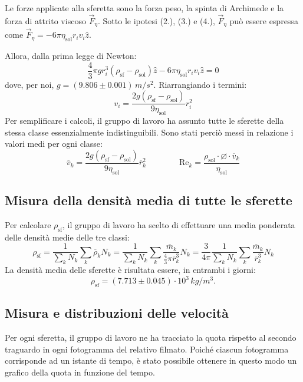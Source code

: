 \documentclass{article}
\newcommand*{\diam}{\varnothing}
\begin{document}
\vspace{2mm}

Le forze applicate alla sferetta sono la forza peso, la spinta di Archimede
e la forza di attrito viscoso $\vec{F}_\eta$.
Sotto le ipotesi (2.), (3.) e (4.), $\vec{F}_\eta$ può essere espressa come
$\vec{F}_\eta = -6\pi\eta_\text{sol} r_i v_i\hat{z}$.

Allora, dalla prima legge di Newton:
\[
  \frac{4}{3}\pi g r_i^3 (\rho_\text{sf} - \rho_\text{sol}) \hat{z}
  -6\pi\eta_\text{sol} r_i v_i\hat{z} = 0
\]
dove, per noi, $g = (9.806\pm0.001)\,\unit{m\per s^2}$.
Riarrangiando i termini:
\[
  v_i = \frac{2g(\rho_\text{sf} - \rho_\text{sol})}{9\eta_\text{sol}} r_i^2
\]
Per semplificare i calcoli, il gruppo di lavoro ha assunto tutte le sferette
della stessa classe essenzialmente indistinguibili. Sono stati perciò messi
in relazione i valori medi per ogni classe: \[
  \overline{v}_k = \frac{2g(\rho_\text{sf} - \rho_\text{sol})}{9\eta_\text{sol}}
  \overline{r}_k^2
  \qquad\qquad
  \text{Re}_k = \frac{
    \rho_\text{sol}\cdot\diam\cdot\overline{v}_k}{\eta_\text{sol}}
\]

\subsection{Misura della densità media di tutte le sferette}
Per calcolare $\rho_\text{sf}$, il gruppo di lavoro ha scelto di
effettuare una media ponderata delle densità medie delle tre classi:
\[
  \rho_\text{sf} = \frac{1}{\sum_k N_k} \sum_k \overline{\rho}_k N_k
    = \frac{1}{\sum_k N_k} \sum_k \frac{\overline{m}_k}{
      \frac{4}{3}\pi \overline{r}_k^3} N_k
    = \frac{3}{4\pi} \frac{1}{\sum_k N_k} \sum_k \frac{\overline{m}_k}{
      \overline{r}_k^3} N_k
\]
La densità media delle sferette è risultata essere,
in entrambi i giorni:
\[\rho_\text{sf} = (7.713\pm0.045)\cdot10^3\,\unit{kg \per m^3}.\]

\subsection{Misura e distribuzioni delle velocità}
Per ogni sferetta, il gruppo di lavoro ne ha tracciato la quota
rispetto al secondo traguardo in ogni fotogramma del relativo filmato.
Poiché ciascun fotogramma corrisponde ad un istante di tempo,
è stato possibile ottenere in questo modo un grafico della quota
in funzione del tempo.
\end{document}
